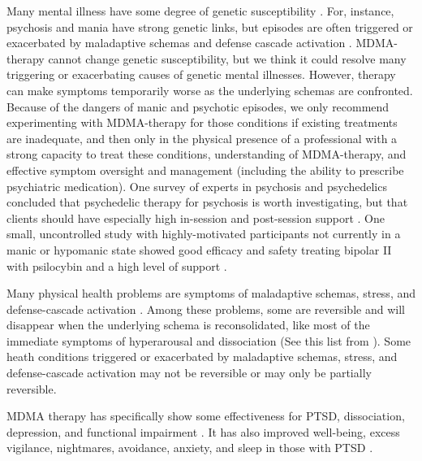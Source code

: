 \documentclass[12pt,letterpaper]{book}
\begin{document}
Many mental illness have some degree of genetic susceptibility \cite{plomin2016top}. For, instance, psychosis and mania have strong genetic links, but episodes are often triggered or exacerbated by maladaptive schemas and defense cascade activation \cite{winkelPsychosisStress,Umeoka2021stressmania}. MDMA-therapy cannot change genetic susceptibility, but we think it could resolve many triggering or exacerbating causes of genetic mental illnesses. However, therapy can make symptoms temporarily worse as the underlying schemas are confronted. Because of the dangers of manic and psychotic episodes, we only recommend experimenting with MDMA-therapy for those conditions if existing treatments are inadequate, and then only in the physical presence of a professional with a strong capacity to treat these conditions, understanding of MDMA-therapy, and effective symptom oversight and management (including the ability to prescribe psychiatric medication). One survey of experts in psychosis and psychedelics concluded that psychedelic therapy for psychosis is worth investigating, but that clients should have especially high in-session and post-session support \cite{la2022Psychosis}. One small, uncontrolled study with highly-motivated participants not currently in a manic or hypomanic state showed good efficacy and safety treating bipolar II with psilocybin and a high level of support \cite{aaronsonBipolarII}.

Many physical health problems are symptoms of maladaptive schemas, stress, and defense-cascade activation \cite{kozlowskaDefenseCascade,eckerUnlocking}. Among these problems, some are reversible and will disappear when the underlying schema is reconsolidated, like most of the immediate symptoms of hyperarousal and dissociation (See this list from \textcite{cheetahSigns}). Some heath conditions triggered or exacerbated by maladaptive schemas, stress, and defense-cascade activation may not be reversible or may only be partially reversible. 

MDMA therapy has specifically show some effectiveness for PTSD, dissociation, depression, and functional impairment \cite{greenMeta}. It has also improved well-being, excess vigilance, nightmares, avoidance, anxiety, and sleep in those with PTSD \cite{smithSystematic}.
\end{document}
